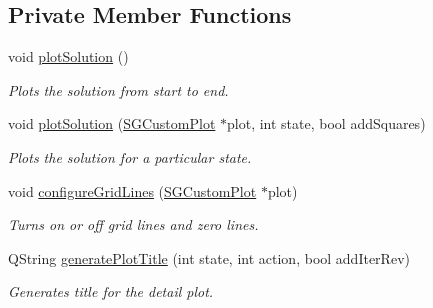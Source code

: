\subsection*{Private Member Functions}
\begin{DoxyCompactItemize}
\item 
\mbox{\label{classSGSolutionHandler__V2_a439bc1bf22c71391bf15ab56162033c7}} 
void \hyperlink{classSGSolutionHandler__V2_a439bc1bf22c71391bf15ab56162033c7}{plot\+Solution} ()
\begin{DoxyCompactList}\small\item\em Plots the solution from start to end. \end{DoxyCompactList}\item 
\mbox{\label{classSGSolutionHandler__V2_ad72688c5cf4853efe570c36266e2a4d9}} 
void \hyperlink{classSGSolutionHandler__V2_ad72688c5cf4853efe570c36266e2a4d9}{plot\+Solution} (\hyperlink{classSGCustomPlot}{S\+G\+Custom\+Plot} $\ast$plot, int state, bool add\+Squares)
\begin{DoxyCompactList}\small\item\em Plots the solution for a particular state. \end{DoxyCompactList}\item 
\mbox{\label{classSGSolutionHandler__V2_a1c262a1305cb11651832db7a66bc6bce}} 
void \hyperlink{classSGSolutionHandler__V2_a1c262a1305cb11651832db7a66bc6bce}{configure\+Grid\+Lines} (\hyperlink{classSGCustomPlot}{S\+G\+Custom\+Plot} $\ast$plot)
\begin{DoxyCompactList}\small\item\em Turns on or off grid lines and zero lines. \end{DoxyCompactList}\item 
\mbox{\label{classSGSolutionHandler__V2_a7596f6e68b9efe4eba44f65dc879013a}} 
Q\+String \hyperlink{classSGSolutionHandler__V2_a7596f6e68b9efe4eba44f65dc879013a}{generate\+Plot\+Title} (int state, int action, bool add\+Iter\+Rev)
\begin{DoxyCompactList}\small\item\em Generates title for the detail plot. \end{DoxyCompactList}\item 
\mbox{\label{classSGSolutionHandler__V2_a073f114bde7dec5cca4952b25922d009}} 

\end{DoxyCompactItemize}

